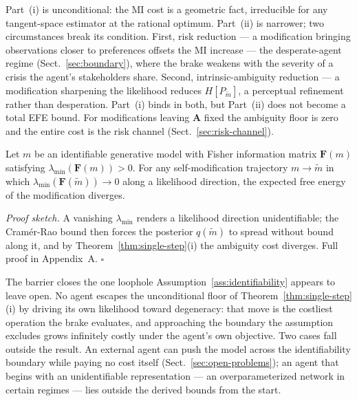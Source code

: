 \documentclass[runningheads]{llncs}
\begin{document}
\begin{remark}
\label{rem:ambiguity-efe}
Part~(i) is unconditional: the MI cost is a geometric fact, irreducible for any tangent-space estimator at the rational optimum. Part~(ii) is narrower; two circumstances break its condition. First, risk reduction --- a modification bringing observations closer to preferences offsets the MI increase --- the desperate-agent regime (Sect.~\ref{sec:boundary}), where the brake weakens with the severity of a crisis the agent's stakeholders share. Second, intrinsic-ambiguity reduction --- a modification sharpening the likelihood reduces $H[P_{\tilde{m}}]$, a perceptual refinement rather than desperation. Part~(i) binds in both, but Part~(ii) does not become a total EFE bound. For modifications leaving $\mathbf{A}$ fixed the ambiguity floor is zero and the entire cost is the risk channel (Sect.~\ref{sec:risk-channel}).
\end{remark}

\begin{proposition}
\label{prop:identifiability}
Let $m$ be an identifiable generative model with Fisher information matrix $\mathbf{F}(m)$ satisfying $\lambda_{\min}(\mathbf{F}(m)) > 0$. For any self-modification trajectory $m \to \tilde{m}$ in which $\lambda_{\min}(\mathbf{F}(\tilde{m})) \to 0$ along a likelihood direction, the expected free energy of the modification diverges.
\end{proposition}

\emph{Proof sketch.} A vanishing $\lambda_{\min}$ renders a likelihood direction unidentifiable; the Cram\'er-Rao bound then forces the posterior $q(\tilde{m})$ to spread without bound along it, and by Theorem~\ref{thm:single-step}(i) the ambiguity cost diverges. Full proof in Appendix~A. $\square$

The barrier closes the one loophole Assumption~\ref{ass:identifiability} appears to leave open. No agent escapes the unconditional floor of Theorem~\ref{thm:single-step}(i) by driving its own likelihood toward degeneracy: that move is the costliest operation the brake evaluates, and approaching the boundary the assumption excludes grows infinitely costly under the agent's own objective. Two cases fall outside the result. An external agent can push the model across the identifiability boundary while paying no cost itself (Sect.~\ref{sec:open-problems}); an agent that begins with an unidentifiable representation --- an overparameterized network in certain regimes --- lies outside the derived bounds from the start.
\end{document}
